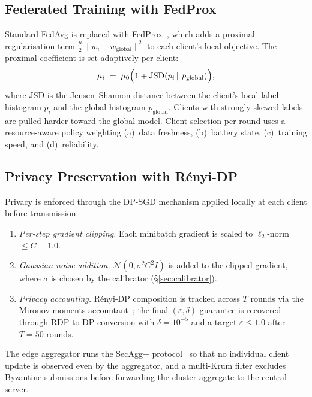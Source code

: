 \documentclass[conference]{IEEEtran}
\newcommand{\eps}{\varepsilon}
\begin{document}
\subsection{Federated Training with FedProx}
Standard FedAvg is replaced with FedProx~\cite{li2020}, which adds a
proximal regularisation term
$\tfrac{\mu}{2}\|w_{i}-w_{\text{global}}\|^{2}$ to each client's local
objective. The proximal coefficient is set adaptively per client:
\begin{equation}
  \mu_{i} \;=\; \mu_{0}\Bigl(1+\mathrm{JSD}(p_{i}\,\|\,p_{\text{global}})\Bigr),
\end{equation}
where $\mathrm{JSD}$ is the Jensen--Shannon distance between the
client's local label histogram $p_{i}$ and the global histogram
$p_{\text{global}}$. Clients with strongly skewed labels are pulled
harder toward the global model. Client selection per round uses a
resource-aware policy weighting (a)~data freshness, (b)~battery state,
(c)~training speed, and (d)~reliability.

\subsection{Privacy Preservation with R\'enyi-DP}\label{sec:dp}
Privacy is enforced through the DP-SGD mechanism applied locally at
each client before transmission:
\begin{enumerate}
\item \emph{Per-step gradient clipping.} Each minibatch gradient is
      scaled to $\ell_{2}$-norm $\le C=1.0$.
\item \emph{Gaussian noise addition.} $\mathcal{N}(0,\sigma^{2}C^{2}I)$
      is added to the clipped gradient, where $\sigma$ is chosen by
      the calibrator (\S\ref{sec:calibrator}).
\item \emph{Privacy accounting.} R\'enyi-DP composition is tracked
      across $T$ rounds via the Mironov moments
      accountant~\cite{mironov2017}; the final $(\eps,\delta)$
      guarantee is recovered through RDP-to-DP conversion with
      $\delta=10^{-5}$ and a target $\eps\le 1.0$ after $T=50$
      rounds.
\end{enumerate}
The edge aggregator runs the SecAgg+ protocol~\cite{bonawitz2017} so
that no individual client update is observed even by the aggregator,
and a multi-Krum filter excludes Byzantine submissions before
forwarding the cluster aggregate to the central server.
\end{document}
